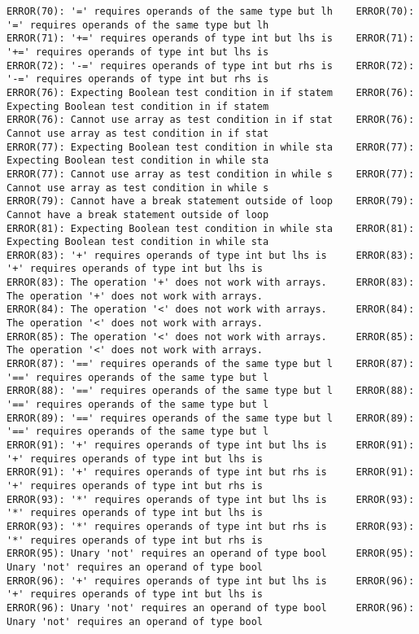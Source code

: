 \documentclass[12pt]{book}
\begin{document}
\begin{lstlisting}
ERROR(70): '=' requires operands of the same type but lh	ERROR(70): '=' requires operands of the same type but lh
ERROR(71): '+=' requires operands of type int but lhs is	ERROR(71): '+=' requires operands of type int but lhs is
ERROR(72): '-=' requires operands of type int but rhs is	ERROR(72): '-=' requires operands of type int but rhs is
ERROR(76): Expecting Boolean test condition in if statem	ERROR(76): Expecting Boolean test condition in if statem
ERROR(76): Cannot use array as test condition in if stat	ERROR(76): Cannot use array as test condition in if stat
ERROR(77): Expecting Boolean test condition in while sta	ERROR(77): Expecting Boolean test condition in while sta
ERROR(77): Cannot use array as test condition in while s	ERROR(77): Cannot use array as test condition in while s
ERROR(79): Cannot have a break statement outside of loop	ERROR(79): Cannot have a break statement outside of loop
ERROR(81): Expecting Boolean test condition in while sta	ERROR(81): Expecting Boolean test condition in while sta
ERROR(83): '+' requires operands of type int but lhs is 	ERROR(83): '+' requires operands of type int but lhs is 
ERROR(83): The operation '+' does not work with arrays.		ERROR(83): The operation '+' does not work with arrays.
ERROR(84): The operation '<' does not work with arrays.		ERROR(84): The operation '<' does not work with arrays.
ERROR(85): The operation '<' does not work with arrays.		ERROR(85): The operation '<' does not work with arrays.
ERROR(87): '==' requires operands of the same type but l	ERROR(87): '==' requires operands of the same type but l
ERROR(88): '==' requires operands of the same type but l	ERROR(88): '==' requires operands of the same type but l
ERROR(89): '==' requires operands of the same type but l	ERROR(89): '==' requires operands of the same type but l
ERROR(91): '+' requires operands of type int but lhs is 	ERROR(91): '+' requires operands of type int but lhs is 
ERROR(91): '+' requires operands of type int but rhs is 	ERROR(91): '+' requires operands of type int but rhs is 
ERROR(93): '*' requires operands of type int but lhs is 	ERROR(93): '*' requires operands of type int but lhs is 
ERROR(93): '*' requires operands of type int but rhs is 	ERROR(93): '*' requires operands of type int but rhs is 
ERROR(95): Unary 'not' requires an operand of type bool 	ERROR(95): Unary 'not' requires an operand of type bool 
ERROR(96): '+' requires operands of type int but lhs is 	ERROR(96): '+' requires operands of type int but lhs is 
ERROR(96): Unary 'not' requires an operand of type bool 	ERROR(96): Unary 'not' requires an operand of type bool 

\end{lstlisting}
\end{document}
